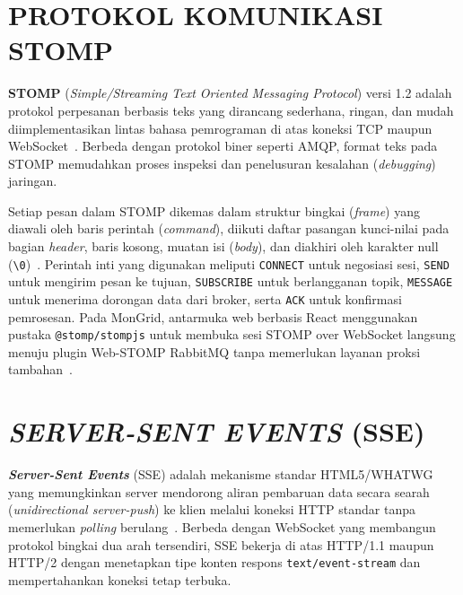 \section{PROTOKOL KOMUNIKASI STOMP}

\textbf{STOMP} (\textit{Simple/Streaming Text Oriented Messaging Protocol}) versi 1.2 adalah protokol perpesanan berbasis teks yang dirancang sederhana, ringan, dan mudah diimplementasikan lintas bahasa pemrograman di atas koneksi TCP maupun WebSocket~\cite{stomp_spec}. Berbeda dengan protokol biner seperti AMQP, format teks pada STOMP memudahkan proses inspeksi dan penelusuran kesalahan (\textit{debugging}) jaringan.

Setiap pesan dalam STOMP dikemas dalam struktur bingkai (\textit{frame}) yang diawali oleh baris perintah (\textit{command}), diikuti daftar pasangan kunci-nilai pada bagian \textit{header}, baris kosong, muatan isi (\textit{body}), dan diakhiri oleh karakter null (\texttt{\textbackslash0})~\cite{stomp_spec}. Perintah inti yang digunakan meliputi \texttt{CONNECT} untuk negosiasi sesi, \texttt{SEND} untuk mengirim pesan ke tujuan, \texttt{SUBSCRIBE} untuk berlangganan topik, \texttt{MESSAGE} untuk menerima dorongan data dari broker, serta \texttt{ACK} untuk konfirmasi pemrosesan. Pada MonGrid, antarmuka web berbasis React menggunakan pustaka \texttt{@stomp/stompjs} untuk membuka sesi STOMP over WebSocket langsung menuju plugin Web-STOMP RabbitMQ tanpa memerlukan layanan proksi tambahan~\cite{rabbitmq_doc, stomp_spec}.

\section{\textit{SERVER-SENT EVENTS} (SSE)}

\textbf{\textit{Server-Sent Events}} (SSE) adalah mekanisme standar HTML5/WHATWG yang memungkinkan server mendorong aliran pembaruan data secara searah (\textit{unidirectional server-push}) ke klien melalui koneksi HTTP standar tanpa memerlukan \textit{polling} berulang~\cite{mdn_sse}. Berbeda dengan WebSocket yang membangun protokol bingkai dua arah tersendiri, SSE bekerja di atas HTTP/1.1 maupun HTTP/2 dengan menetapkan tipe konten respons \texttt{text/event-stream} dan mempertahankan koneksi tetap terbuka.

